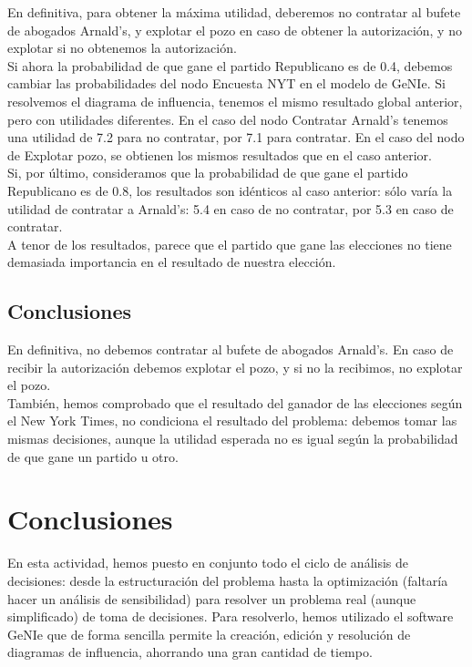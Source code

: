 \documentclass[12pt,a4paper,openright,final]{article}
\begin{document}
En definitiva, para obtener la máxima utilidad, deberemos no contratar al bufete de abogados Arnald's, y explotar el pozo en caso de obtener la autorización, y no explotar si no obtenemos la autorización.\\

Si ahora la probabilidad de que gane el partido Republicano es de 0.4, debemos cambiar las probabilidades del nodo Encuesta NYT en el modelo de GeNIe. Si resolvemos el diagrama de influencia, tenemos el mismo resultado global anterior, pero con utilidades diferentes. En el caso del nodo Contratar Arnald's tenemos una utilidad de 7.2 para no contratar, por 7.1 para contratar. En el caso del nodo de Explotar pozo, se obtienen los mismos resultados que en el caso anterior.\\

Si, por último, consideramos que la probabilidad de que gane el partido Republicano es de 0.8, los resultados son idénticos al caso anterior: sólo varía la utilidad de contratar a Arnald's: 5.4 en caso de no contratar, por 5.3 en caso de contratar.\\

A tenor de los resultados, parece que el partido que gane las elecciones no tiene demasiada importancia en el resultado de nuestra elección.

\subsection{Conclusiones}

En definitiva, no debemos contratar al bufete de abogados Arnald's. En caso de recibir la autorización debemos explotar el pozo, y si no la recibimos, no explotar el pozo.\\

También, hemos comprobado que el resultado del ganador de las elecciones según el New York Times, no condiciona el resultado del problema: debemos tomar las mismas decisiones, aunque la utilidad esperada no es igual según la probabilidad de que gane un partido u otro.

\section{Conclusiones}

En esta actividad, hemos puesto en conjunto todo el ciclo de análisis de decisiones: desde la estructuración del problema hasta la optimización (faltaría hacer un análisis de sensibilidad) para resolver un problema real  (aunque simplificado) de toma de decisiones. Para resolverlo, hemos utilizado el software GeNIe que de forma sencilla permite la creación, edición y resolución de diagramas de influencia, ahorrando una gran cantidad de tiempo.
\end{document}
